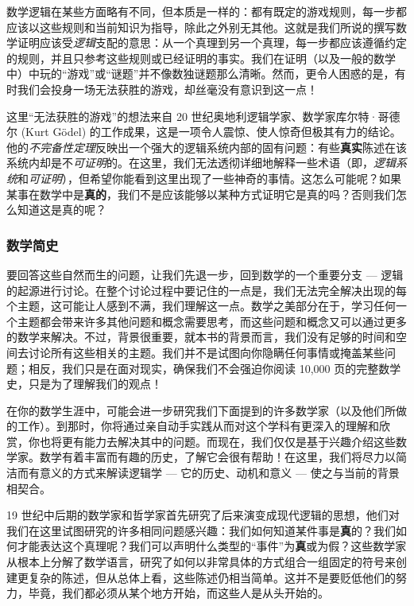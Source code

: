数学逻辑在某些方面略有不同，但本质是一样的：都有既定的游戏规则，每一步都应该以这些规则和当前知识为指导，除此之外别无其他。这就是我们所说的撰写数学证明应该受\emph{逻辑}支配的意思：从一个真理到另一个真理，每一步都应该遵循约定的规则，并且只参考这些规则或已经证明的事实。我们在证明（以及一般的数学中）中玩的``游戏''或``谜题''并不像数独谜题那么清晰。然而，更令人困惑的是，有时我们会投身一场无法获胜的游戏，却丝毫没有意识到这一点！

这里``无法获胜的游戏''的想法来自 20 世纪奥地利逻辑学家、数学家库尔特·哥德尔 (Kurt Gödel) 的工作成果，这是一项令人震惊、使人惊奇但极其有力的结论。他的\emph{不完备性定理}反映出一个强大的逻辑系统内部的固有问题：有些\textbf{真实}陈述在该系统内却是不\emph{可证明}的。在这里，我们无法透彻详细地解释一些术语（即，\emph{逻辑系统}和\emph{可证明}），但希望你能看到这里出现了一些神奇的事情。这怎么可能呢？如果某事在数学中是\textbf{真的}，我们不是应该能够以某种方式证明它是真的吗？否则我们怎么知道这是真的呢？

\subsubsection*{数学简史}

要回答这些自然而生的问题，让我们先退一步，回到数学的一个重要分支 --- 逻辑的起源进行讨论。在整个讨论过程中要记住的一点是，我们无法完全解决出现的每个主题，这可能让人感到不满，我们理解这一点。数学之美部分在于，学习任何一个主题都会带来许多其他问题和概念需要思考，而这些问题和概念又可以通过更多的数学来解决。不过，背景很重要，就本书的背景而言，我们没有足够的时间和空间去讨论所有这些相关的主题。我们并不是试图向你隐瞒任何事情或掩盖某些问题；相反，我们只是在面对现实，确保我们不会强迫你阅读 10,000 页的完整数学史，只是为了理解我们的观点！

在你的数学生涯中，可能会进一步研究我们下面提到的许多数学家（以及他们所做的工作）。到那时，你将通过亲自动手实践从而对这个学科有更深入的理解和欣赏，你也将更有能力去解决其中的问题。而现在，我们仅仅是基于兴趣介绍这些数学家。数学有着丰富而有趣的历史，了解它会很有帮助！在这里，我们将尽力以简洁而有意义的方式来解读逻辑学 --- 它的历史、动机和意义 --- 使之与当前的背景相契合。

19 世纪中后期的数学家和哲学家首先研究了后来演变成现代逻辑的思想，他们对我们在这里试图研究的许多相同问题感兴趣：我们如何知道某件事是\textbf{真}的？我们如何才能表达这个真理呢？我们可以声明什么类型的``事件''为\textbf{真}或为假？这些数学家从根本上分解了数学语言，研究了如何以非常具体的方式组合一组固定的符号来创建更复杂的陈述，但从总体上看，这些陈述仍相当简单。这并不是要贬低他们的努力，毕竟，我们都必须从某个地方开始，而这些人是从头开始的。

